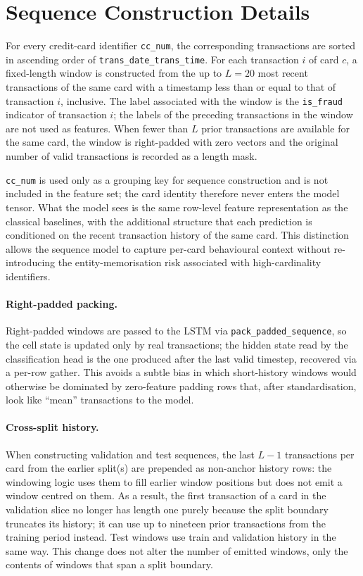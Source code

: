 \documentclass[oneside,12pt,parskip=half,american,numbers=noenddot]{scrreprt}
\begin{document}
\section{Sequence Construction Details}
\label{app:seq}

For every credit-card identifier \texttt{cc\_num}, the corresponding transactions are sorted in ascending order of \texttt{trans\_date\_trans\_time}. For each transaction $i$ of card $c$, a fixed-length window is constructed from the up to $L = 20$ most recent transactions of the same card with a timestamp less than or equal to that of transaction $i$, inclusive. The label associated with the window is the \texttt{is\_fraud} indicator of transaction $i$; the labels of the preceding transactions in the window are not used as features. When fewer than $L$ prior transactions are available for the same card, the window is right-padded with zero vectors and the original number of valid transactions is recorded as a length mask.

\texttt{cc\_num} is used only as a grouping key for sequence construction and is not included in the feature set; the card identity therefore never enters the model tensor. What the model sees is the same row-level feature representation as the classical baselines, with the additional structure that each prediction is conditioned on the recent transaction history of the same card. This distinction allows the sequence model to capture per-card behavioural context without re-introducing the entity-memorisation risk associated with high-cardinality identifiers.

\paragraph{Right-padded packing.} Right-padded windows are passed to the LSTM via \texttt{pack\_padded\_sequence}, so the cell state is updated only by real transactions; the hidden state read by the classification head is the one produced after the last valid timestep, recovered via a per-row gather. This avoids a subtle bias in which short-history windows would otherwise be dominated by zero-feature padding rows that, after standardisation, look like ``mean'' transactions to the model.

\paragraph{Cross-split history.} When constructing validation and test sequences, the last $L - 1$ transactions per card from the earlier split(s) are prepended as non-anchor history rows: the windowing logic uses them to fill earlier window positions but does not emit a window centred on them. As a result, the first transaction of a card in the validation slice no longer has length one purely because the split boundary truncates its history; it can use up to nineteen prior transactions from the training period instead. Test windows use train and validation history in the same way. This change does not alter the number of emitted windows, only the contents of windows that span a split boundary.
\end{document}
